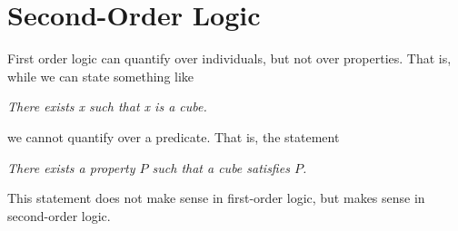 \documentclass{article}
\begin{document}
\section{Second-Order Logic} 

  First order logic can quantify over individuals, but not over properties. That is, while we can state something like 

  \begin{center}
    \textit{There exists x such that x is a cube.}
  \end{center} 

  we cannot quantify over a predicate. That is, the statement 
  
  \begin{center}
    \textit{There exists a property $P$ such that a cube satisfies $P$.}
  \end{center}

  This statement does not make sense in first-order logic, but makes sense in second-order logic. 
  
\end{document}
